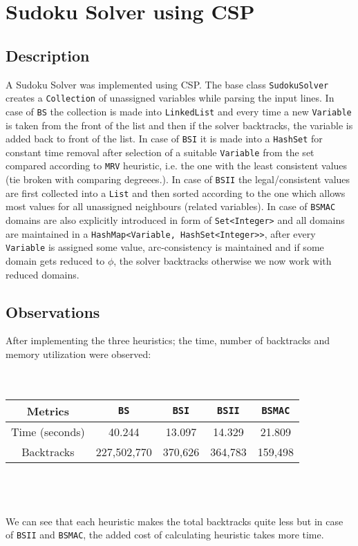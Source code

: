 \documentclass{article}
\begin{document}
\maketitle
\section{Sudoku Solver using CSP}
\subsection{Description}
A Sudoku Solver was implemented using CSP. The base class \verb|SudokuSolver| creates a \verb|Collection| of unassigned variables while parsing the input lines. In case of \verb|BS| the collection is made into \verb|LinkedList| and every time a new \verb|Variable| is taken from the front of the list and then if the solver backtracks, the variable is added back to front of the list. In case of \verb|BSI| it is made into a \verb|HashSet| for constant time removal after selection of a suitable \verb|Variable| from the set compared according to \verb|MRV| heuristic, i.e. the one with the least consistent values (tie broken with comparing degreees.). In case of \verb|BSII| the legal/consistent values are first collected into a \verb|List| and then sorted according to the one which allows most values for all unassigned neighbours (related variables). In case of \verb|BSMAC| domains are also explicitly introduced in form of \verb|Set<Integer>| and all domains are maintained in a \verb|HashMap<Variable, HashSet<Integer>>|, after every \verb|Variable| is assigned some value, arc-consistency is maintained and if some domain gets reduced to $\phi$, the solver backtracks otherwise we now work with reduced domains.

\subsection{Observations}
After implementing the three heuristics; the time, number of backtracks and memory utilization were observed:
\\\\\\
\begin{adjustbox}{center}
\begin{tabular}{|c|c|c|c|c|}
\hline
Metrics&\verb|BS|&\verb|BSI|&\verb|BSII|&\verb|BSMAC|\\\hline
Time (seconds)&40.244&13.097&14.329&21.809\\
Backtracks&227,502,770&370,626&364,783&159,498\\\hline
\end{tabular}
\end{adjustbox}
\\\\\\
We can see that each heuristic makes the total backtracks quite less but in case of \verb|BSII| and \verb|BSMAC|, the added cost of calculating heuristic takes more time.
\end{document}

